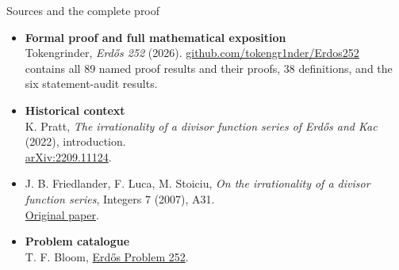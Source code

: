 \documentclass[11pt,aspectratio=169]{beamer}
\newcommand{\lean}[1]{\texttt{\detokenize{#1}}}
\begin{document}

\begin{frame}{Sources and the complete proof}

\small
\begin{itemize}
\item \textbf{Formal proof and full mathematical exposition}\\
Tokengrinder, \emph{Erd\H{o}s 252} (2026).
\href{https://github.com/tokengr1nder/Erdos252}{github.com/tokengr1nder/Erdos252}\\
\lean{PROOF.pdf} contains all 89 named proof results and their proofs,
38 definitions, and the six statement-audit results.
\item \textbf{Historical context}\\
K. Pratt, \emph{The irrationality of a divisor function series of
Erd\H{o}s and Kac} (2022), introduction.\\
\href{https://arxiv.org/abs/2209.11124}{arXiv:2209.11124}.
\item J. B. Friedlander, F. Luca, M. Stoiciu, \emph{On the irrationality of
a divisor function series}, Integers 7 (2007), A31.\\
\href{https://math.colgate.edu/~integers/h31/h31.pdf}{Original paper}.
\item \textbf{Problem catalogue}\\
T. F. Bloom, \href{https://www.erdosproblems.com/252}{Erd\H{o}s Problem 252}.
\end{itemize}

\end{frame}
\end{document}
